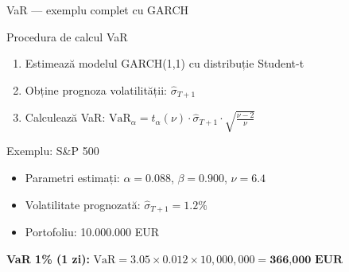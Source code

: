 \documentclass[9pt, aspectratio=169, t]{beamer}
\begin{document}
\begin{frame}{VaR --- exemplu complet cu GARCH}
    \small
        \begin{block}{Procedura de calcul VaR}
            \begin{enumerate}
                \item Estimează modelul GARCH(1,1) cu distribuție Student-t
                \item Obține prognoza volatilității: $\hat{\sigma}_{T+1}$
                \item Calculează VaR: $\text{VaR}_\alpha = t_\alpha(\nu) \cdot \hat{\sigma}_{T+1} \cdot \sqrt{\frac{\nu-2}{\nu}}$
            \end{enumerate}
        \end{block}

        \vspace{0.2cm}

        \begin{exampleblock}{Exemplu: S\&P 500}
            \begin{itemize}
                \item Parametri estimați: $\alpha = 0.088$, $\beta = 0.900$, $\nu = 6.4$
                \item Volatilitate prognozată: $\hat{\sigma}_{T+1} = 1.2\%$
                \item Portofoliu: 10.000.000 EUR
            \end{itemize}

            \vspace{0.2cm}

            \textbf{VaR 1\% (1 zi):}
            $\text{VaR} = 3.05 \times 0.012 \times 10{,}000{,}000 = \textbf{366{,}000 EUR}$
        \end{exampleblock}
\end{frame}
\end{document}
